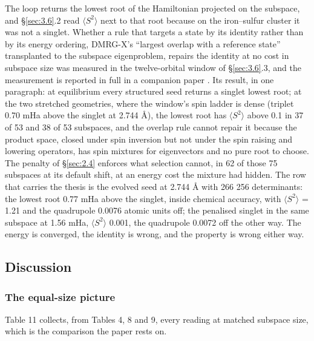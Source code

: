 \documentclass[11pt]{article}
\begin{document}
The loop returns the lowest root of the Hamiltonian projected on the subspace, and \S\ref{sec:3.6}.2 read $\langle S^{2}\rangle$ next to that root because on the iron--sulfur cluster it was not a singlet. Whether a rule that targets a state by its identity rather than by its energy ordering, DMRG-X's ``largest overlap with a reference state'' \cite{Khemani2016,GonzalezGarcia2026} transplanted to the subspace eigenproblem, repairs the identity at no cost in subspace size was measured in the twelve-orbital window of \S\ref{sec:3.6}.3, and the measurement is reported in full in a companion paper \cite{LowestRoot}. Its result, in one paragraph: at equilibrium every structured seed returns a singlet lowest root; at the two stretched geometries, where the window's spin ladder is dense (triplet 0.70 mHa above the singlet at 2.744 \AA{}), the lowest root has $\langle S^{2}\rangle$ above 0.1 in 37 of 53 and 38 of 53 subspaces, and the overlap rule cannot repair it because the product space, closed under spin inversion but not under the spin raising and lowering operators, has spin mixtures for eigenvectors and no pure root to choose. The penalty of \S\ref{sec:2.4} enforces what selection cannot, in 62 of those 75 subspaces at its default shift, at an energy cost the mixture had hidden. The row that carries the thesis is the evolved seed at 2.744 \AA{} with 266 256 determinants: the lowest root 0.77 mHa above the singlet, inside chemical accuracy, with $\langle S^{2}\rangle$ = 1.21 and the quadrupole 0.0076 atomic units off; the penalised singlet in the same subspace at 1.56 mHa, $\langle S^{2}\rangle$ 0.001, the quadrupole 0.0072 off the other way. The energy is converged, the identity is wrong, and the property is wrong either way.

\subsection{Discussion}\label{sec:3.7}


\subsubsection{The equal-size picture}\label{sec:3.7.1}


Table 11 collects, from Tables 4, 8 and 9, every reading at matched subspace size, which is the comparison the paper rests on.
\end{document}
